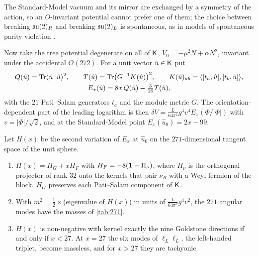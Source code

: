 The Standard-Model vacuum and its mirror are exchanged by a symmetry of the action, so an $O$-invariant potential cannot prefer one of them; the choice between
breaking $\mathfrak{su}(2)_R$ and breaking $\mathfrak{su}(2)_L$ is spontaneous, as in models of spontaneous parity violation \cite{SenjanovicMohapatra75}.

Now take the tree potential degenerate on all of $\mathsf K$, $V_0=-\mu^2N+\alpha N^2$, invariant under the accidental $O(272)$. For a unit vector $\hat u\in\mathsf K$ put
\[
\begin{gathered}
Q(\hat u)=\operatorname{Tr}(\hat u^{\!\top}\hat u)^2,\qquad T(\hat u)=\operatorname{Tr}\bigl(G^{-1}K(\hat u)\bigr)^2,\qquad K(\hat u)_{ab}=\langle[t_a,\hat u],[t_b,\hat u]\rangle,\\
E_x(\hat u)=8x\,Q(\hat u)-\tfrac3{16}T(\hat u),
\end{gathered}
\]
with the $21$ Pati--Salam generators $t_a$ and the module metric $G$. The orientation-dependent part of the leading logarithm is then
$\delta V=\tfrac L{64\pi^2}g^4v^4E_x(\Phi/|\Phi|)$ with $v=|\Phi|/\sqrt2$, and at the Standard-Model point $E_x(\hat u_0)=2x-99$.

\begin{theorem}
\label{thm:fullsecond}
Let $H(x)$ be the second variation of $E_x$ at $\hat u_0$ on the $271$-dimensional tangent space of the unit sphere.
\begin{enumerate}[label=(\roman*),leftmargin=2.2em]
\item $H(x)=H_G+xH_F$ with $H_F=-8(\mathbf 1-\Pi_\nu)$, where $\Pi_\nu$ is the orthogonal projector of rank $32$ onto the kernels that pair $\nu_R$ with a Weyl fermion of the
block. $H_G$ preserves each Pati--Salam component of $\mathsf K$.
\item With $m^2=\tfrac12\times$(eigenvalue of $H(x)$) in units of $\tfrac L{64\pi^2}g^4v^2$, the $271$ angular modes have the masses of \cref{tab:271}.
\item $H(x)$ is non-negative with kernel exactly the nine Goldstone directions if and only if $x<27$. At $x=27$ the six modes of $\ell_L\ell_L$, the left-handed triplet,
become massless, and for $x>27$ they are tachyonic.
\end{enumerate}
\end{theorem}

